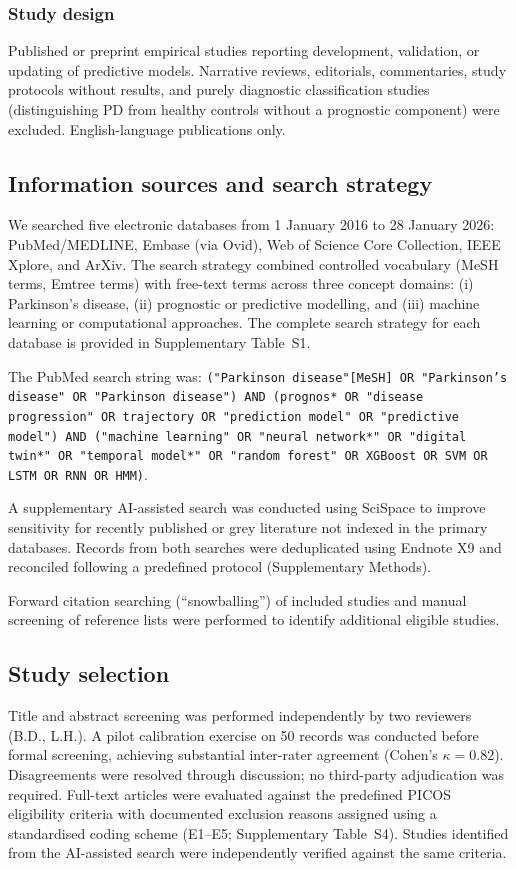 \documentclass[11pt,a4paper]{article}
\begin{document}
\subsubsection{Study design}
Published or preprint empirical studies reporting development, validation, or updating of predictive models. Narrative reviews, editorials, commentaries, study protocols without results, and purely diagnostic classification studies (distinguishing PD from healthy controls without a prognostic component) were excluded. English-language publications only.

\subsection{Information sources and search strategy}

We searched five electronic databases from 1 January 2016 to 28 January 2026: PubMed/MEDLINE, Embase (via Ovid), Web of Science Core Collection, IEEE Xplore, and ArXiv. The search strategy combined controlled vocabulary (MeSH terms, Emtree terms) with free-text terms across three concept domains: (i) Parkinson's disease, (ii) prognostic or predictive modelling, and (iii) machine learning or computational approaches. The complete search strategy for each database is provided in Supplementary Table~S1.

The PubMed search string was: \texttt{("Parkinson disease"[MeSH] OR "Parkinson's disease" OR "Parkinson disease") AND (prognos* OR "disease progression" OR trajectory OR "prediction model" OR "predictive model") AND ("machine learning" OR "neural network*" OR "digital twin*" OR "temporal model*" OR "random forest" OR XGBoost OR SVM OR LSTM OR RNN OR HMM)}.

A supplementary AI-assisted search was conducted using SciSpace to improve sensitivity for recently published or grey literature not indexed in the primary databases. Records from both searches were deduplicated using Endnote X9 and reconciled following a predefined protocol (Supplementary Methods).

Forward citation searching (``snowballing'') of included studies and manual screening of reference lists were performed to identify additional eligible studies.

\subsection{Study selection}

Title and abstract screening was performed independently by two reviewers (B.D., L.H.). A pilot calibration exercise on 50 records was conducted before formal screening, achieving substantial inter-rater agreement (Cohen's $\kappa = 0.82$). Disagreements were resolved through discussion; no third-party adjudication was required. Full-text articles were evaluated against the predefined PICOS eligibility criteria with documented exclusion reasons assigned using a standardised coding scheme (E1--E5; Supplementary Table~S4). Studies identified from the AI-assisted search were independently verified against the same criteria.
\end{document}
